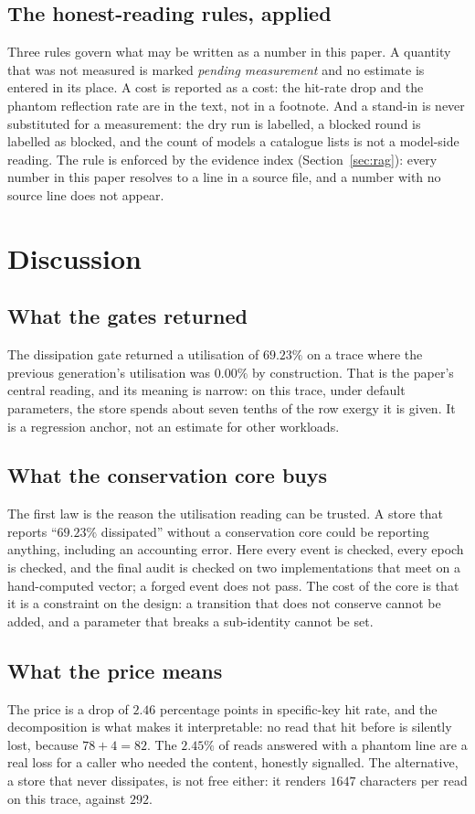 \documentclass[11pt,a4paper]{article}
\begin{document}
\subsection{The honest-reading rules, applied}
Three rules govern what may be written as a number in this paper. A quantity that was not measured is marked \emph{pending measurement} and no estimate is entered in its place. A cost is reported as a cost: the hit-rate drop and the phantom reflection rate are in the text, not in a footnote. And a stand-in is never substituted for a measurement: the dry run is labelled, a blocked round is labelled as blocked, and the count of models a catalogue lists is not a model-side reading. The rule is enforced by the evidence index (Section~\ref{sec:rag}): every number in this paper resolves to a line in a source file, and a number with no source line does not appear.

\section{Discussion}
\label{sec:discussion}

\subsection{What the gates returned}
The dissipation gate returned a utilisation of $69.23\%$ on a trace where the previous generation's utilisation was $0.00\%$ by construction. That is the paper's central reading, and its meaning is narrow: on this trace, under default parameters, the store spends about seven tenths of the row exergy it is given. It is a regression anchor, not an estimate for other workloads.

\subsection{What the conservation core buys}
The first law is the reason the utilisation reading can be trusted. A store that reports ``$69.23\%$ dissipated'' without a conservation core could be reporting anything, including an accounting error. Here every event is checked, every epoch is checked, and the final audit is checked on two implementations that meet on a hand-computed vector; a forged event does not pass. The cost of the core is that it is a constraint on the design: a transition that does not conserve cannot be added, and a parameter that breaks a sub-identity cannot be set.

\subsection{What the price means}
The price is a drop of $2.46$ percentage points in specific-key hit rate, and the decomposition is what makes it interpretable: no read that hit before is silently lost, because $78 + 4 = 82$. The $2.45\%$ of reads answered with a phantom line are a real loss for a caller who needed the content, honestly signalled. The alternative, a store that never dissipates, is not free either: it renders $1647$ characters per read on this trace, against $292$.
\end{document}
